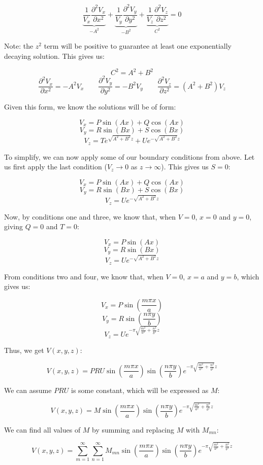 \begin{enumerate}
        $$\underbrace{\frac{1}{V_x}\frac{\partial^2V_x}{\partial x^2}}_{-A^2}+\underbrace{\frac{1}{V_y}\frac{\partial^2V_y}{\partial y^2}}_{-B^2}+\underbrace{\frac{1}{V_z}\frac{\partial^2V_z}{\partial z^2}}_{C^2}=0$$

        Note: the $z^2$ term will be positive to guarantee at least one exponentially decaying solution. This gives us:

        $$C^2=A^2+B^2$$
        $$\frac{\partial^2V_x}{\partial x^2}=-A^2V_x\quad\quad\frac{\partial^2V_y}{\partial y^2}=-B^2V_y\quad\quad\frac{\partial^2V_z}{\partial z^2}=(A^2+B^2)V_z$$

        Given this form, we know the solutions will be of form:

        $$V_x=P\sin(Ax)+Q\cos(Ax)$$
        $$V_y=R\sin(Bx)+S\cos(Bx)$$
        $$V_z=Te^{\sqrt{A^2+B^2}z}+Ue^{-\sqrt{A^2+B^2}z}$$

        To simplify, we can now apply some of our boundary conditions from above. Let us first apply the last condition ($V_z\to0$ as $z\to\infty$). This gives us $S=0$:

        $$V_x=P\sin(Ax)+Q\cos(Ax)$$
        $$V_y=R\sin(Bx)+S\cos(Bx)$$
        $$V_z=Ue^{-\sqrt{A^2+B^2}z}$$

        Now, by conditions one and three, we know that, when $V=0$, $x=0$ and $y=0$, giving $Q=0$ and $T=0$:

        $$V_x=P\sin(Ax)$$
        $$V_y=R\sin(Bx)$$
        $$V_z=Ue^{-\sqrt{A^2+B^2}z}$$

        From conditions two and four, we know that, when $V=0$, $x=a$ and $y=b$, which gives us:

        $$V_x=P\sin\left( \frac{m\pi x}{a} \right)$$
        $$V_y=R\sin\left( \frac{n\pi y}{b} \right)$$
        $$V_z=Ue^{-\pi\sqrt{\frac{m^2}{a^2}+\frac{n^2}{b^2}}z}$$

        Thus, we get $V(x,y,z)$:

        $$V(x,y,z)=PRU\sin\left( \frac{m\pi x}{a} \right)\sin\left( \frac{n\pi y}{b} \right)e^{-\pi\sqrt{\frac{m^2}{a^2}+\frac{n^2}{b^2}}z}$$

        We can assume $PRU$ is some constant, which will be expressed as $M$:

        $$V(x,y,z)=M\sin\left( \frac{m\pi x}{a} \right)\sin\left( \frac{n\pi y}{b} \right)e^{-\pi\sqrt{\frac{m^2}{a^2}+\frac{n^2}{b^2}}z}$$

        We can find all values of $M$ by summing and replacing $M$ with $M_{mn}$:

        $$V(x,y,z)=\sum_{m=1}^\infty\sum_{n=1}^\infty M_{mn}\sin\left( \frac{m\pi x}{a} \right)\sin\left( \frac{n\pi y}{b} \right)e^{-\pi\sqrt{\frac{m^2}{a^2}+\frac{n^2}{b^2}}z}$$


\end{enumerate}
